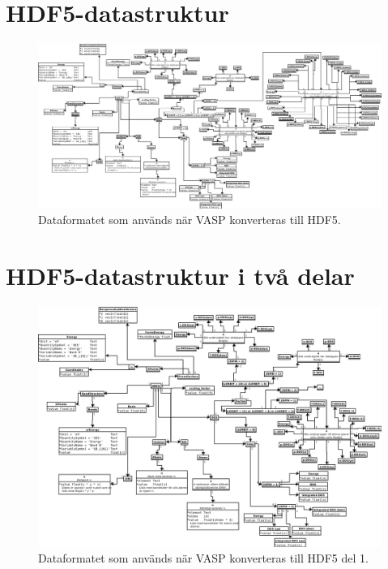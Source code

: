 \documentclass[a4paper,12pt]{article}
\begin{document}
\begin{appendices}

\section{HDF5-datastruktur}
\label{appendix:hdf5-format}
\begin{figure}[H]
    \centering
    \includegraphics[scale=0.28,angle=-90,origin=c]{hdf5-dataformat3.png}
    \caption{Dataformatet som används när VASP konverteras till HDF5.}
    \label{fig:hdf5-dataformat-roterad}
\end{figure}

\section{HDF5-datastruktur i två delar}
\label{appendix:hdf5-format2}
\begin{figure}[H]
    \centering
    \includegraphics[scale=0.42,angle=-90,origin=c]{hdf5-dataformat3del1.png}
    \caption{Dataformatet som används när VASP konverteras till HDF5 del 1.}
\end{figure}


\end{appendices}
\end{document}
